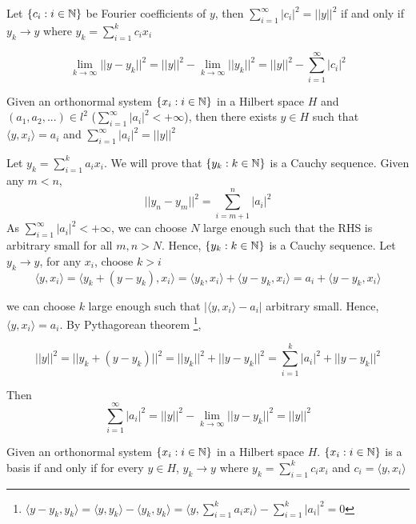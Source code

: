 \documentclass{report}
\begin{document}
\begin{proposition}
    Let $\{c_i: i \in \mathbb{N} \}$ be Fourier coefficients of $y$, then   $\sum_{i=1}^\infty |c_i|^2 = ||y||^2$ if and only if $y_k \to y$ where $y_k = \sum_{i=1}^k c_i x_i$
\end{proposition}

\[
    \lim_{k \to \infty} ||y - y_k||^2 = ||y||^2 - \lim_{k \to \infty} ||y_k||^2 = ||y||^2 - \sum_{i=1}^\infty |c_i|^2
\]



\begin{theorem}
    Given an orthonormal system $\{x_i: i \in \mathbb{N} \}$ in a Hilbert space $H$ and $(a_1, a_2, ...) \in l^2$ ($\sum_{i=1}^\infty |a_i|^2 < +\infty$), then there exists $y \in H$ such that 
    $\langle y, x_i \rangle = a_i$ and $\sum_{i=1}^\infty |a_i|^2 = ||y||^2$
\end{theorem}

Let $y_k = \sum_{i=1}^k a_i x_i$. We will prove that $\{y_k: k \in \mathbb{N} \}$ is a Cauchy sequence. Given any $m < n$,
\[
    ||y_n - y_m||^2 = \sum_{i=m+1}^n |a_i|^2
\]
As $\sum_{i=1}^\infty |a_i|^2 < +\infty$, we can choose $N$ large enough such that the RHS is arbitrary small for all $m, n > N$. Hence, $\{y_k: k \in \mathbb{N} \}$ is a Cauchy sequence. Let $y_k \to y$, for any $x_i$, choose $k > i$
\[
    \langle y, x_i \rangle = \langle y_k + (y - y_k), x_i \rangle = \langle y_k, x_i \rangle + \langle y - y_k, x_i \rangle = a_i + \langle y - y_k, x_i \rangle
\]

we can choose $k$ large enough such that $|\langle y, x_i \rangle - a_i|$ arbitrary small. Hence, $\langle y, x_i \rangle = a_i$. By Pythagorean theorem \footnote{$\langle y - y_k, y_k\rangle = \langle y, y_k\rangle - \langle y_k, y_k\rangle = \langle y, \sum_{i=1}^k a_i x_i\rangle - \sum_{i=1}^k |a_i|^2 = 0$},

\[
    ||y||^2 = ||y_k + (y - y_k)||^2 = ||y_k||^2 + ||y - y_k||^2 = \sum_{i=1}^k |a_i|^2 + ||y - y_k||^2
\]

Then 
\[
    \sum_{i=1}^\infty |a_i|^2 = ||y||^2 - \lim_{k \to \infty} ||y - y_k||^2 = ||y||^2
\]

\begin{theorem}
    \label{theorem18}
    Given an orthonormal system $\{x_i: i \in \mathbb{N} \}$ in a Hilbert space $H$. $\{x_i: i \in \mathbb{N} \}$ is a basis if and only if for every $y \in H$, $y_k \to y$ where $y_k = \sum_{i=1}^k c_i x_i$ and $c_i = \langle y, x_i \rangle$
\end{theorem}
\end{document}
